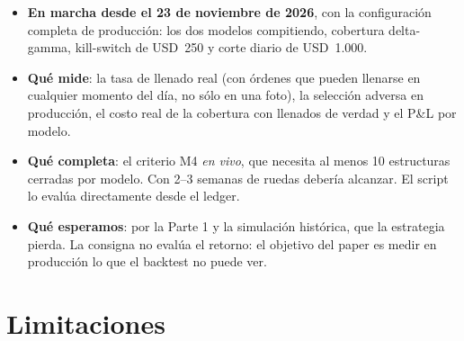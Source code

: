 \documentclass[11pt,a4paper]{article}
\newcommand{\code}[1]{\texttt{\detokenize{#1}}}
\newcommand{\usd}[1]{USD~#1}
\begin{document}
\begin{itemize}
\item \textbf{En marcha desde el 23 de noviembre de 2026}, con la configuración completa de producción: los dos
  modelos compitiendo, cobertura delta-gamma, kill-switch de \usd{250} y corte diario de \usd{1.000}.
\item \textbf{Qué mide}: la tasa de llenado real (con órdenes que pueden llenarse en cualquier momento del día, no sólo
  en una foto), la selección adversa en producción, el costo real de la cobertura con llenados de verdad y el P\&L por
  modelo.
\item \textbf{Qué completa}: el criterio M4 \emph{en vivo}, que necesita al menos 10 estructuras cerradas por modelo.
  Con 2–3 semanas de ruedas debería alcanzar. El script \code{scorecard.py} lo evalúa directamente desde el ledger.
\item \textbf{Qué esperamos}: por la Parte 1 y la simulación histórica, que la estrategia pierda. La consigna no evalúa
  el retorno: el objetivo del paper es medir en producción lo que el backtest no puede ver.
\end{itemize}

\newpage
\section{Limitaciones}
\end{document}
